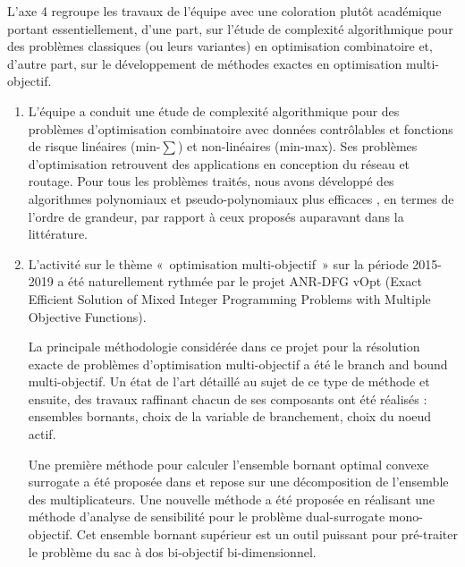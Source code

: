 L'axe 4 regroupe les travaux de l'équipe avec une coloration plutôt académique portant essentiellement, d'une part, sur l'étude de complexité algorithmique pour des problèmes classiques (ou leurs variantes) en optimisation combinatoire et, d'autre part, sur le développement de méthodes exactes en optimisation multi-objectif.      

\begin{enumerate}
    \item L’équipe a conduit une étude de complexité algorithmique pour des problèmes d'optimisation combinatoire avec données contrôlables et fonctions de risque linéaires (min-$\sum$) et non-linéaires (min-max). Ses problèmes d’optimisation retrouvent des applications en conception du réseau et routage. Pour tous les problèmes traités, nous avons développé des algorithmes polynomiaux et pseudo-polynomiaux plus efficaces \cite{gurevsky:hal-01262639,gurevsky:hal-01272518,gurevsky:hal-01341259,gurevsky:hal-02504487}, en termes de l'ordre de grandeur, par rapport à ceux proposés auparavant dans la littérature. 
    
    \item L’activité sur le thème « optimisation multi-objectif » sur la période 2015-2019 a été naturellement rythmée par le projet ANR-DFG vOpt (Exact Efficient Solution of Mixed Integer Programming Problems with Multiple Objective Functions).


La principale méthodologie considérée dans ce projet pour la résolution exacte de problèmes d’optimisation multi-objectif a été le branch and bound multi-objectif. Un état de l’art détaillé au sujet de ce type de méthode \cite{przybylski:hal-01717951} et ensuite, des travaux raffinant chacun de ses composants ont été réalisés : ensembles bornants, choix de la variable de branchement, choix du noeud actif. 


Une première méthode pour calculer l’ensemble bornant optimal convexe surrogate a été proposée dans \cite{cerqueus:hal-011583} et repose sur une décomposition de l’ensemble des multiplicateurs. Une nouvelle méthode \cite{przybylski:hal-02480174} a été proposée en réalisant une méthode d’analyse de sensibilité pour le problème dual-surrogate mono-objectif. Cet ensemble bornant supérieur est un outil puissant pour pré-traiter le problème du sac à dos bi-objectif bi-dimensionnel.


\end{enumerate}

